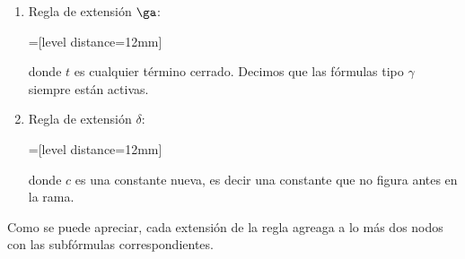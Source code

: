 \documentclass[11pt,letterpaper]{article}
\begin{document}
\begin{definicion}
\begin{enumerate}
  \item Regla de extensión $\ga$:
  \begin{center}
  =[level distance=12mm]
\end{center}
donde $t$ es cualquier término cerrado.  Decimos que las fórmulas
tipo $\gamma$ siempre están activas.
          
  \item Regla de extensión $\delta$: 
  \begin{center}
  =[level distance=12mm]
\end{center}
donde $c$ es una constante nueva, es decir una constante que no figura
antes en la rama.
 \end{enumerate}
\end{definicion}
Como se puede apreciar, cada extensi\'on de la regla agreaga a lo m\'as dos 
nodos con las subf\'ormulas correspondientes.\\
\end{document}
